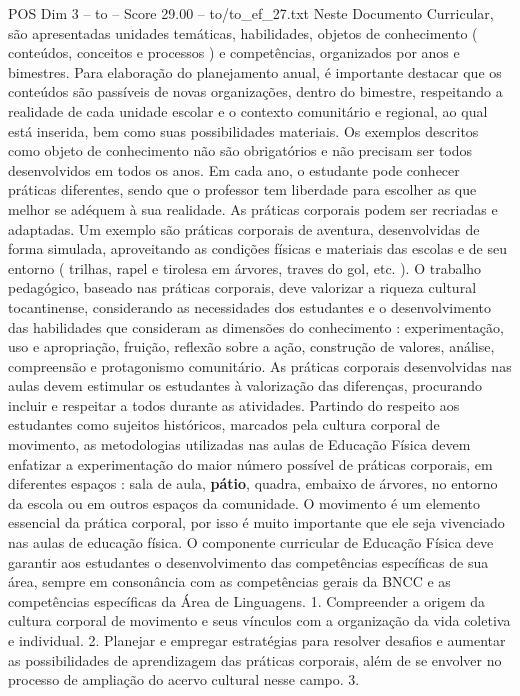\begin{textsample}{POS Dim 3 – to – Score 29.00 – to/to\_ef\_27.txt}
Neste Documento Curricular, são apresentadas unidades temáticas, habilidades, objetos de conhecimento ( conteúdos, conceitos e processos ) e competências, organizados por anos e bimestres.
Para elaboração do planejamento anual, é importante destacar que os conteúdos são passíveis de novas organizações, dentro do bimestre, respeitando a realidade de cada unidade escolar e o contexto comunitário e regional, ao qual está inserida, bem como suas possibilidades materiais.
Os exemplos descritos como objeto de conhecimento não são obrigatórios e não precisam ser todos desenvolvidos em todos os anos.
Em cada ano, o estudante pode conhecer práticas diferentes, sendo que o professor tem liberdade para escolher as que melhor se adéquem à sua realidade.
As práticas corporais podem ser recriadas e adaptadas.
Um exemplo são práticas corporais de aventura, desenvolvidas de forma simulada, aproveitando as condições físicas e materiais das escolas e de seu entorno ( trilhas, rapel e tirolesa em árvores, traves do gol, etc. ).
O trabalho pedagógico, baseado nas práticas corporais, deve valorizar a riqueza cultural tocantinense, considerando as necessidades dos estudantes e o desenvolvimento das habilidades que consideram as dimensões do conhecimento : experimentação, uso e apropriação, fruição, reflexão sobre a ação, construção de valores, análise, compreensão e protagonismo comunitário.
As práticas corporais desenvolvidas nas aulas devem estimular os estudantes à valorização das diferenças, procurando incluir e respeitar a todos durante as atividades.
Partindo do respeito aos estudantes como sujeitos históricos, marcados pela cultura corporal de movimento, as metodologias utilizadas nas aulas de Educação Física devem enfatizar a experimentação do maior número possível de práticas corporais, em diferentes espaços : sala de aula, \textbf{pátio}, quadra, embaixo de árvores, no entorno da escola ou em outros espaços da comunidade.
O movimento é um elemento essencial da prática corporal, por isso é muito importante que ele seja vivenciado nas aulas de educação física.
O componente curricular de Educação Física deve garantir aos estudantes o desenvolvimento das competências específicas de sua área, sempre em consonância com as competências gerais da BNCC e as competências específicas da Área de Linguagens. 1.
Compreender a origem da cultura corporal de movimento e seus vínculos com a organização da vida coletiva e individual. 2.
Planejar e empregar estratégias para resolver desafios e aumentar as possibilidades de aprendizagem das práticas corporais, além de se envolver no processo de ampliação do acervo cultural nesse campo. 3.

\end{textsample}
